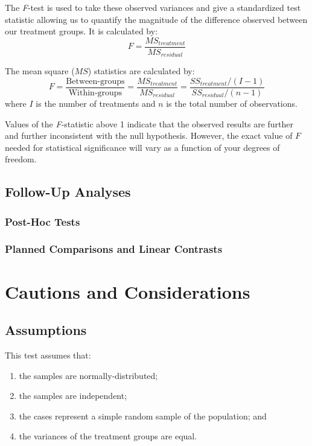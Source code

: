 The \textit{F}-test  is used to take these observed variances and give a standardized test statistic allowing us to quantify the magnitude of the difference observed between our treatment groups. It is calculated by:
\begin{equation}
F = \frac{MS_{treatment}}{MS_{residual}}
\end{equation}

The mean square ($MS$) statistics  are calculated by:
\begin{equation*}
F = \frac{\text{Between-groups}}{\text{Within-groups}} = \frac{MS_{treatment}}{MS_{residual}} = \frac{SS_{treatment}/(I-1)}{SS_{residual}/(n-1)}
\end{equation*}
where $I$ is the number of treatments and $n$ is the total number of observations.

Values of the \textit{F}-statistic above 1 indicate that the observed results are further and further inconsistent with the null hypothesis. However, the exact value of $F$ needed for statistical significance will vary as a function of your degrees of freedom.

\subsection{Follow-Up Analyses}

\subsubsection{Post-Hoc Tests}

\subsubsection{Planned Comparisons and Linear Contrasts}

\section{Cautions and Considerations}

\subsection{Assumptions}

This test assumes that:

\begin{enumerate}
\item the samples are normally-distributed;
\item the samples are independent;
\item the cases represent a simple random sample of the population; and
\item the variances of the treatment groups are equal.
\end{enumerate}

